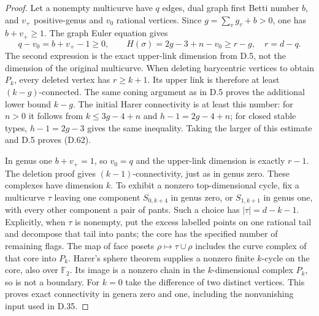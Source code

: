 \begin{proof}
Let a nonempty multicurve have $q$ edges, dual graph first
Betti number $b$, and $v_+$ positive-genus and $v_0$ rational
vertices.  Since $g=\sum_v g_v+b>0$, one has
$b+v_+\geq1$.  The graph Euler equation gives
\[
       q-v_0=b+v_+-1\geq0,\qquad
       H(\sigma)=2g-3+n-v_0\geq r-g,
       \quad r=d-q.                                          \tag{D.67}
\]
The second expression is the exact upper-link dimension
from D.5, not the dimension of the original multicurve.
When deleting barycentric vertices to obtain $P_k$, every
deleted vertex has $r\geq k+1$.  Its upper link is therefore
at least $(k-g)$-connected.  The same coning argument as
in D.5 proves the additional lower bound $k-g$.
The initial Harer connectivity is at least this number:
for $n>0$ it follows from $k\leq3g-4+n$ and
$h-1=2g-4+n$; for closed stable types,
$h-1=2g-3$ gives the same inequality.
Taking the larger of this estimate and D.5 proves (D.62).

In genus one $b+v_+=1$, so $v_0=q$ and the upper-link
dimension is exactly $r-1$.  The deletion proof gives
$(k-1)$-connectivity, just as in genus zero.  These
complexes have dimension $k$.  To exhibit a nonzero
top-dimensional cycle, fix a multicurve $\tau$ leaving
one component $S_{0,k+4}$ in genus zero, or $S_{1,k+1}$
in genus one, with every other component a pair of
pants.  Such a choice has $|\tau|=d-k-1$.  Explicitly,
when $\tau$ is nonempty, put the excess labelled points
on one rational tail and decompose that tail into pants;
the core has the specified number of remaining flags.
The map of face posets
$\rho\mapsto\tau\cup\rho$ includes the curve complex of
that core into $P_k$.  Harer's sphere theorem supplies
a nonzero finite $k$-cycle on the core, also over
$\mathbb F_2$.  Its image is a nonzero chain in the
$k$-dimensional complex $P_k$, so is not a boundary.
For $k=0$ take the difference of two distinct vertices.
This proves exact connectivity in genera zero and one,
including the nonvanishing input used in D.35.


\end{proof}
